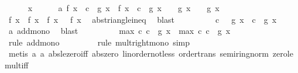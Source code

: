 \begin{isabellebody}
\ \ \ \ \isamarkupfalse%
\ x\isanewline
\ \ \ \ \isamarkupfalse%
\ a{\isacharcolon}{\kern0pt}\ {\isachardoublequoteopen}{\isasymbar}f{}\ x{\isasymbar}\ {\isasymle}\ c{}\ {\isacharasterisk}{\kern0pt}\ {\isasymbar}g{}\ x{\isasymbar}\ {\isasymand}\ {\isasymbar}f{}\ x{\isasymbar}\ {\isasymle}\ c{}\ {\isacharasterisk}{\kern0pt}\ {\isasymbar}g{}\ x{\isasymbar}\ {\isasymand}\ {}\ {\isasymle}\ g{}\ x\ {\isasymand}\ {}\ {\isasymle}\ g{}\ x{\isachardoublequoteclose}\isanewline
\ \ \ \ \isamarkupfalse%
\ {\isachardoublequoteopen}{\isasymbar}f{}\ x\ {\isacharplus}{\kern0pt}\ f{}\ x{\isasymbar}\ {\isasymle}\ {\isasymbar}f{}\ x\ {\isasymbar}\ {\isacharplus}{\kern0pt}\ {\isasymbar}f{}\ x{\isasymbar}{\isachardoublequoteclose}\ \isamarkupfalse%
\ abs{\isacharunderscore}{\kern0pt}triangle{\isacharunderscore}{\kern0pt}ineq\ \isamarkupfalse%
\ blast\isanewline
\ \ \ \ \isamarkupfalse%
\ \isamarkupfalse%
\ {\isachardoublequoteopen}{\isachardot}{\kern0pt}{\isachardot}{\kern0pt}{\isachardot}{\kern0pt}\ {\isasymle}\ c{}\ {\isacharasterisk}{\kern0pt}\ \ {\isasymbar}g{}\ x{\isasymbar}\ {\isacharplus}{\kern0pt}\ c{}\ {\isacharasterisk}{\kern0pt}\ {\isasymbar}g{}\ x{\isasymbar}{\isachardoublequoteclose}\ \isamarkupfalse%
\ a\ add{\isacharunderscore}{\kern0pt}mono\ \isamarkupfalse%
\ blast\isanewline
\ \ \ \ \isamarkupfalse%
\ \isamarkupfalse%
\ {\isachardoublequoteopen}{\isachardot}{\kern0pt}{\isachardot}{\kern0pt}{\isachardot}{\kern0pt}\ {\isasymle}\ max\ c{}\ c{}\ {\isacharasterisk}{\kern0pt}\ {\isasymbar}g{}\ x{\isasymbar}\ {\isacharplus}{\kern0pt}\ max\ c{}\ c{}\ {\isacharasterisk}{\kern0pt}\ {\isasymbar}g{}\ x{\isasymbar}{\isachardoublequoteclose}\ \isanewline
\ \ \ \ \ \ \isamarkupfalse%
\ {\isacharparenleft}{\kern0pt}rule\ add{\isacharunderscore}{\kern0pt}mono{\isacharparenright}{\kern0pt}\isanewline
\ \ \ \ \ \ \ \isamarkupfalse%
\ {\isacharparenleft}{\kern0pt}rule\ mult{\isacharunderscore}{\kern0pt}right{\isacharunderscore}{\kern0pt}mono{\isacharcomma}{\kern0pt}\ simp{\isacharparenright}{\kern0pt}\isanewline
\ \ \ \ \ \ \ \isamarkupfalse%
\ {\isacharparenleft}{\kern0pt}metis\ a\ a{}\ abs{\isacharunderscore}{\kern0pt}le{\isacharunderscore}{\kern0pt}zero{\isacharunderscore}{\kern0pt}iff\ abs{\isacharunderscore}{\kern0pt}zero\ linorder{\isacharunderscore}{\kern0pt}not{\isacharunderscore}{\kern0pt}less\ order{\isacharunderscore}{\kern0pt}trans\ semiring{\isacharunderscore}{\kern0pt}norm{\isacharparenleft}{\kern0pt}{}{}{\isacharparenright}{\kern0pt}\ zero{\isacharunderscore}{\kern0pt}le{\isacharunderscore}{\kern0pt}mult{\isacharunderscore}{\kern0pt}iff{\isacharparenright}{\kern0pt}\isanewline

\end{isabellebody}

